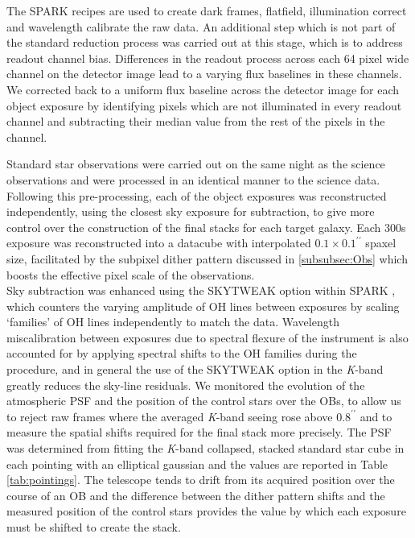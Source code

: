\documentclass[fleqn,usenatbib]{mn2e}
\begin{document}
The SPARK recipes are used to create dark frames, flatfield, illumination correct and wavelength calibrate the raw data.
An additional step which is not part of the standard reduction process was carried out at this stage, which is to address readout channel bias.
Differences in the readout process across each 64 pixel wide channel on the detector image lead to a varying flux baselines in these channels.
We corrected back to a uniform flux baseline across the detector image for each object exposure by identifying pixels which are not illuminated in every readout channel and subtracting their median value from the rest of the pixels in the channel.

Standard star observations were carried out on the same night as the science observations and were processed in an identical manner to the science data.
Following this pre-processing, each of the object exposures was reconstructed independently, using the closest sky exposure for subtraction, to give more control over the construction of the final stacks for each target galaxy.
Each 300s exposure was reconstructed into a datacube with interpolated $0.1\times0.1^{\prime\prime}$ spaxel size, facilitated by the subpixel dither pattern discussed in \cref{subsubsec:Obs} which boosts the effective pixel scale of the observations. \\

Sky subtraction was enhanced using the SKYTWEAK option within SPARK \citep{Davies2007}, which counters the varying amplitude of OH lines between exposures by scaling `families' of OH lines independently to match the data.
Wavelength miscalibration between exposures due to spectral flexure of the instrument is also accounted for by applying spectral shifts to the OH families during the procedure, and in general the use of the SKYTWEAK option in the {\it K}-band greatly reduces the sky-line residuals. 
We monitored the evolution of the atmospheric PSF and the position of the control stars over the OBs, to allow us to reject raw frames where the averaged {\it K}-band seeing rose above $0.8^{\prime\prime}$ and to measure the spatial shifts required for the final stack more precisely.
The PSF was determined from fitting the {\it K}-band collapsed, stacked standard star cube in each pointing with an elliptical gaussian and the values are reported in Table \ref{tab:pointings}.
The telescope tends to drift from its acquired position over the course of an OB and the difference between the dither pattern shifts and the measured position of the control stars provides the value by which each exposure must be shifted to create the stack. \\
\end{document}
